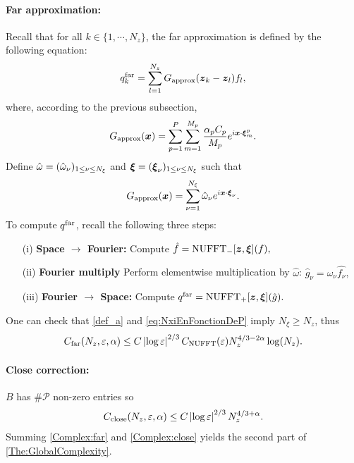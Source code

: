 \documentclass[smallextended]{svjour3}
\begin{document}
\paragraph{Far approximation:} Recall that for all $k \in \{1,\cdots,N_z\}$, the far approximation is defined by the following equation:
\[ q^{\text{far}}_k = \sum_{l=1}^{N_z} G_{\textup{approx}}(\boldsymbol{z}_k - \boldsymbol{z}_l) f_l,\]
where, according to the previous subsection,
\[G_{\textup{approx}}(\boldsymbol{x}) = \sum_{p=1}^P\sum_{m = 1}^{M_p} \dfrac{\alpha_pC_p}{M_p}e^{i \boldsymbol{x}\cdot \boldsymbol{\xi}^p_m}.\]
Define $\hat{\omega} = (\hat{\omega}_{\nu})_{1 \leq \nu \leq N_\xi}$ and $\boldsymbol{\xi} = (\boldsymbol{\xi}_{\nu})_{1 \leq \nu \leq N_\xi}$ such that
\[ G_{\textup{approx}}(\boldsymbol{x}) = \sum_{\nu=1}^{N_\xi} \hat{\omega}_\nu e^{i \boldsymbol{x} \cdot \boldsymbol{\xi}_\nu}.\]
To compute $q^{\textup{far}}$, recall the following three steps:
\begin{itemize}
	\item[(i)] \textbf{Space $\rightarrow$ Fourier: } Compute $\hat{f} = \textup{NUFFT}_-[\boldsymbol{z},\boldsymbol{\xi}](f),$
	\item[(ii)] \textbf{Fourier multiply} Perform elementwise multiplication by $\hat{\omega}$: $\hat{g}_{\nu} = \hat{\omega}_\nu \hat{f_\nu},$
	\item[(iii)] \textbf{Fourier $\rightarrow$ Space: } Compute $q^{\text{far}} =  \textup{NUFFT}_+[\boldsymbol{z},\boldsymbol{\xi}](\hat{g}).$
\end{itemize}
One can check that \eqref{def_a} and \eqref{eq:NxiEnFonctionDeP} imply $N_{\xi} \geq N_z$, thus
\begin{equation}
	\label{Complex:far}
	C_{\textup{far}}(N_z,\varepsilon,\alpha) \leq C 	\left\lvert \log \varepsilon \right\rvert^{2/3} C_{\textup{NUFFT}}(\varepsilon) N_z^{4/3 - 2\alpha } \log(N_z).
\end{equation}
\paragraph{Close correction:} $B$ has $\# \mathcal{P}$ non-zero entries so 
\begin{equation}
	\label{Complex:close}
	C_{\textup{close}}(N_z,\varepsilon,\alpha) \leq C \left\lvert \log\varepsilon \right\rvert^{2/3}N_z^{4/3 + \alpha}.
\end{equation}
Summing \eqref{Complex:far} and \eqref{Complex:close} yields the second part of \autoref{The:GlobalComplexity}. 
																																																		
\end{document}
